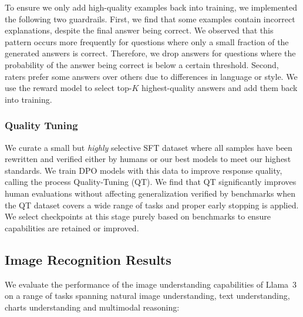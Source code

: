 To ensure we only add high-quality examples back into training, we implemented the following two guardrails. First, we find that some examples contain incorrect explanations, despite the final answer being correct. We observed that this pattern occurs more frequently for questions where only a small fraction of the generated answers is correct. Therefore, we drop answers for questions where the probability of the answer being correct is below a certain threshold. Second, raters prefer some answers over others due to differences in language or style. We use the reward model to select top-$K$ highest-quality answers and add them back into training.

\subsubsection{Quality Tuning}
\label{subsubsection:vision_quality_tuning}
We curate a small but \emph{highly} selective SFT dataset where all samples have been rewritten and verified either by humans or our best models to meet our highest standards. We train DPO models with this data to improve response quality, calling the process Quality-Tuning (QT). We find that QT significantly improves human evaluations without affecting generalization verified by benchmarks when the QT dataset covers a wide range of tasks and proper early stopping is applied. We select checkpoints at this stage purely based on benchmarks to ensure capabilities are retained or improved.

\subsection{Image Recognition Results}
\label{section:results_image_recognition}

We evaluate the performance of the image understanding capabilities of Llama~3 on a range of tasks spanning natural image understanding, text understanding, charts understanding and multimodal reasoning:

